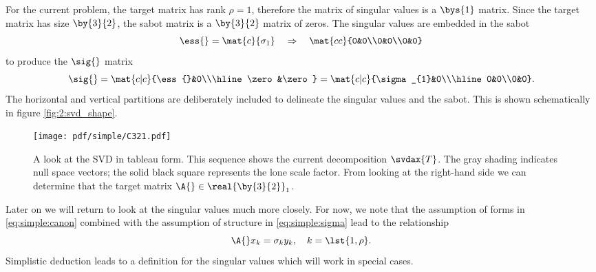For the current problem, the target matrix has rank $\rho=1$, therefore the matrix of singular values is a $\bys{1}$ matrix. Since the target matrix has size $\by{3}{2}$, the sabot matrix is a $\by{3}{2}$ matrix of zeros. The singular values are embedded in the sabot
\begin{equation}
  \ess{}=\mat{c}{\sigma_{1}} \quad \Rightarrow \quad \mat{cc}{0&0\\0&0\\0&0}
\end{equation}
to produce the $\sig{}$ matrix
\begin{equation}
  \sig{}=\mat{c|c}{\ess{}&0\\\hline\zero&\zero} = \mat{c|c}{\sigma_{1}&0\\\hline0&0\\0&0}.
  \label{eq:simple:sigma}
\end{equation}
The horizontal and vertical partitions are deliberately included to delineate the singular values and the sabot. This is shown schematically in figure \eqref{fig:2:svd_shape}.

\begin{figure}[h] %
   \centering
   \texttt{[image: pdf/simple/C321.pdf]} 
   \caption[The SVD in tableau form]{A look at the SVD in tableau form. This sequence shows the current decomposition $\svdax{T}$. The gray shading indicates null space vectors; the solid black square represents the lone scale factor. From looking at the right-hand side we can determine that the target matrix $\A{}\in\real{\by{3}{2}}_{1}$.}
   \label{fig:2:svd_shape}
\end{figure}

Later on we will return to look at the singular values much more closely. For now, we note that the assumption of forms in \eqref{eq:simple:canon} combined with the assumption of structure in \eqref{eq:simple:sigma} lead to the relationship
\begin{equation}
  \A{}x_{k} = \sigma_{k} y_{k}, \quad k=\lst{1,\rho}.
\end{equation}
Simplistic deduction leads to a definition for the singular values which will work in special cases.

